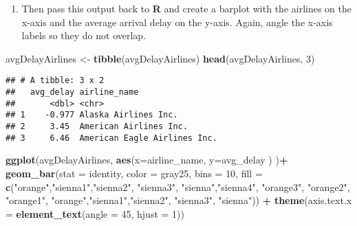 \documentclass[
]{article}
\newenvironment{Shaded}{\begin{snugshade}}{\end{snugshade}}
\newcommand{\AttributeTok}[1]{\textcolor[rgb]{0.13,0.29,0.53}{#1}}
\newcommand{\DecValTok}[1]{\textcolor[rgb]{0.00,0.00,0.81}{#1}}
\newcommand{\FunctionTok}[1]{\textcolor[rgb]{0.13,0.29,0.53}{\textbf{#1}}}
\newcommand{\NormalTok}[1]{#1}
\newcommand{\OtherTok}[1]{\textcolor[rgb]{0.56,0.35,0.01}{#1}}
\newcommand{\SpecialCharTok}[1]{\textcolor[rgb]{0.81,0.36,0.00}{\textbf{#1}}}
\newcommand{\StringTok}[1]{\textcolor[rgb]{0.31,0.60,0.02}{#1}}
\providecommand{\tightlist}{%
  \setlength{\itemsep}{0pt}\setlength{\parskip}{0pt}}
\begin{document}
\begin{enumerate}
\def\labelenumi{\arabic{enumi}.}
\setcounter{enumi}{1}
\tightlist
\item
  Then pass this output back to \textbf{R} and create a barplot with the
  airlines on the x-axis and the average arrival delay on the y-axis.
  Again, angle the x-axis labels so they do not overlap.
\end{enumerate}

\begin{Shaded}
\begin{Highlighting}[]
\NormalTok{avgDelayAirlines }\OtherTok{\textless{}{-}} \FunctionTok{tibble}\NormalTok{(avgDelayAirlines)}
\FunctionTok{head}\NormalTok{(avgDelayAirlines, }\DecValTok{3}\NormalTok{)}
\end{Highlighting}
\end{Shaded}

\begin{verbatim}
## # A tibble: 3 x 2
##   avg_delay airline_name                
##       <dbl> <chr>                       
## 1    -0.977 Alaska Airlines Inc.        
## 2     3.45  American Airlines Inc.      
## 3     6.46  American Eagle Airlines Inc.
\end{verbatim}

\begin{Shaded}
\begin{Highlighting}[]
\FunctionTok{ggplot}\NormalTok{(avgDelayAirlines, }\FunctionTok{aes}\NormalTok{(}\AttributeTok{x=}\NormalTok{airline\_name, }\AttributeTok{y=}\NormalTok{avg\_delay ) )}\SpecialCharTok{+}
  \FunctionTok{geom\_bar}\NormalTok{(}\AttributeTok{stat =} \StringTok{\textquotesingle{}identity\textquotesingle{}}\NormalTok{, }\AttributeTok{color =} \StringTok{\textquotesingle{}gray25\textquotesingle{}}\NormalTok{, }\AttributeTok{bins =} \DecValTok{10}\NormalTok{, }
                 \AttributeTok{fill =} \FunctionTok{c}\NormalTok{(}\StringTok{"orange"}\NormalTok{,}\StringTok{"sienna1"}\NormalTok{,}\StringTok{"sienna2"}\NormalTok{,}
                          \StringTok{"sienna3"}\NormalTok{, }\StringTok{"sienna"}\NormalTok{,}\StringTok{"sienna4"}\NormalTok{, }
                          \StringTok{"orange3"}\NormalTok{, }\StringTok{"orange2"}\NormalTok{, }\StringTok{"orange1"}\NormalTok{, }
                          \StringTok{"orange"}\NormalTok{,}\StringTok{"sienna1"}\NormalTok{,}\StringTok{"sienna2"}\NormalTok{,}
                          \StringTok{"sienna3"}\NormalTok{, }\StringTok{"sienna"}\NormalTok{)) }\SpecialCharTok{+}
  \FunctionTok{theme}\NormalTok{(}\AttributeTok{axis.text.x =} \FunctionTok{element\_text}\NormalTok{(}\AttributeTok{angle =} \DecValTok{45}\NormalTok{, }\AttributeTok{hjust =} \DecValTok{1}\NormalTok{))}
\end{Highlighting}
\end{Shaded}
\end{document}
